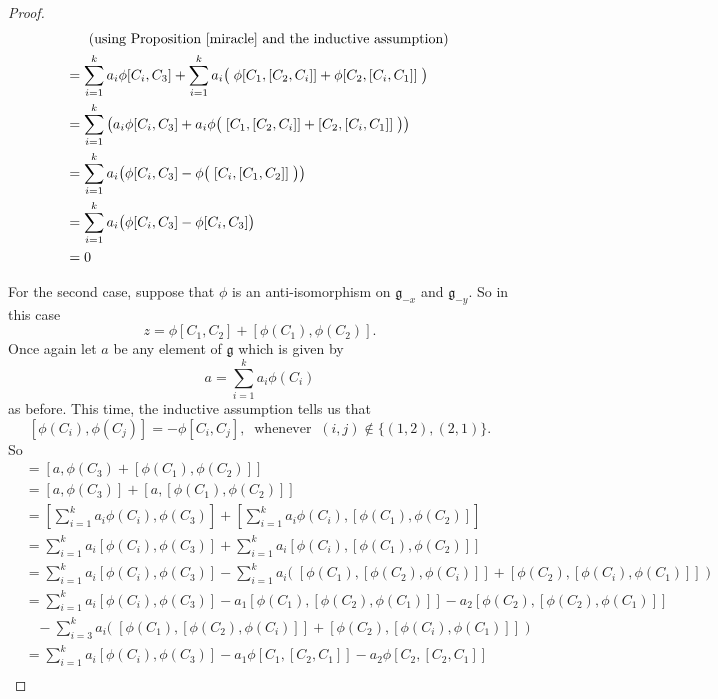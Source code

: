 \documentclass[honours]{UNSWthesis}
\newcommand{\g}{\mathfrak{g}}
\newcommand{\1}{\mathbf{e}_{1}}
\newcommand{\2}{\mathbf{e}_{3}}
\newcommand{\3}{\mathbf{e}_{3}}
\begin{document}
\begin{proof}
\begin{align*}
& \;\;\;\;\;\; \text{(using Proposition \ref{miracle} and the inductive assumption) } \\
&=\sum\limits_{i=1}^{k} a_{i}\phi[C_{i},C_{3}]+ \sum\limits_{i=1}^{k} a_{i}\big(\; \phi[C_{1},[C_{2},C_{i}]]+\phi[C_{2},[C_{i},C_{1}]] \;\big) \\
&=\sum\limits_{i=1}^{k} \big( a_{i}\phi[C_{i},C_{3}]+ a_{i}\phi\big(\; [C_{1},[C_{2},C_{i}]]+[C_{2},[C_{i},C_{1}]] \;\big)\big) \\
&=\sum\limits_{i=1}^{k} a_{i}\big(\phi[C_{i},C_{3}]- \phi\big(\; [C_{i},[C_{1},C_{2}]] \;\big)\big) \\
&=\sum\limits_{i=1}^{k} a_{i}\big(\phi[C_{i},C_{3}]- \phi[C_{i},C_{3}] \big) \\
&=0
\end{align*}

For the second case, suppose that $\phi$ is an anti-isomorphism on $\g_{-x}$ and $\g_{-y}$. So in this case
\[
z=\phi[C_{1},C_{2}]+[\phi(C_{1}),\phi(C_{2})].
\]
\newline
Once again let $a$ be any element of $\g$ which is given by 
\[
a=\sum\limits_{i=1}^{k} a_{i}\phi(C_{i})
\] as before.
This time, the inductive assumption tells us that 
\[
[\phi(C_{i}),\phi(C_{j})]=-\phi[C_{i},C_{j}],\;\;\text{whenever}\;\; (i,j) \notin \{(1,2),(2,1)\}.
\]
\newline
So
\begin{align*}
[a,z] &= [a,\phi(C_{3})+[\phi(C_{1}),\phi(C_{2})]] \\
&=[a,\phi(C_{3})]+[a,[\phi(C_{1}),\phi(C_{2})]] \\
&=\left[\sum\limits_{i=1}^{k} a_{i}\phi(C_{i}),\phi(C_{3}) \right]+\left[ \sum\limits_{i=1}^{k} a_{i}\phi(C_{i}),[\phi(C_{1}),\phi(C_{2})]\right] \\
&=\sum\limits_{i=1}^{k} a_{i}[\phi(C_{i}),\phi(C_{3})]+\sum\limits_{i=1}^{k} a_{i}[\phi(C_{i}),[\phi(C_{1}),\phi(C_{2})]] \\
&=\sum\limits_{i=1}^{k} a_{i}[\phi(C_{i}),\phi(C_{3})]- \sum\limits_{i=1}^{k} a_{i}\big(\; [\phi(C_{1}),[\phi(C_{2}),\phi(C_{i})]]+[\phi(C_{2}),[\phi(C_{i}),\phi(C_{1})]]\;\big) \\
&=\sum\limits_{i=1}^{k} a_{i}[\phi(C_{i}),\phi(C_{3})]-a_{1}[\phi(C_{1}),[\phi(C_{2}),\phi(C_{1})]]-a_{2}[\phi(C_{2}),[\phi(C_{2}),\phi(C_{1})]] \\
&\;\;\;- \sum\limits_{i=3}^{k} a_{i}\big(\; [\phi(C_{1}),[\phi(C_{2}),\phi(C_{i})]]+[\phi(C_{2}),[\phi(C_{i}),\phi(C_{1})]] \;\big) \\
&= \sum\limits_{i=1}^{k} a_{i}[\phi(C_{i}),\phi(C_{3})]-a_{1}\phi[C_{1},[C_{2},C_{1}]]-a_{2}\phi[C_{2},[C_{2},C_{1}]] \\

\end{align*}
\end{proof}
\end{document}

